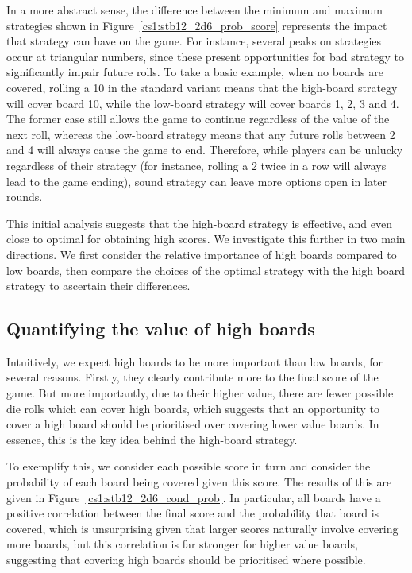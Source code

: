 In a more abstract sense, the difference between the minimum and maximum strategies shown in  Figure~\ref{cs1:stb12_2d6_prob_score} represents the impact that strategy can have on the game. For instance, several peaks on strategies occur at triangular numbers, since these present opportunities for bad strategy to significantly impair future rolls. To take a basic example, when no boards are covered, rolling a 10 in the standard variant means that the high-board strategy will cover board 10, while the low-board strategy will cover boards 1, 2, 3 and 4. The former case still allows the game to continue regardless of the value of the next roll, whereas the low-board strategy means that any future rolls between 2 and 4 will always cause the game to end. Therefore, while players can be unlucky regardless of their strategy (for instance, rolling a 2 twice in a row will always lead to the game ending), sound strategy can leave more options open in later rounds.

This initial analysis suggests that the high-board strategy is effective, and even close to optimal for obtaining high scores. We investigate this further in two main directions. We first consider the relative importance of high boards compared to low boards, then compare the choices of the optimal strategy with the high board strategy to ascertain their differences.

\subsection{Quantifying the value of high boards}

Intuitively, we expect high boards to be more important than low boards, for several reasons. Firstly, they clearly contribute more to the final score of the game. But more importantly, due to their higher value, there are fewer possible die rolls which can cover high boards, which suggests that an opportunity to cover a high board should be prioritised over covering lower value boards. In essence, this is the key idea behind the high-board strategy. 

To exemplify this, we consider each possible score in turn and consider the probability of each board being covered given this score. The results of this are given in Figure~\ref{cs1:stb12_2d6_cond_prob}.  In particular, all boards have a positive correlation between the final score and the probability that board is covered, which is unsurprising given that larger scores naturally involve covering more boards, but this correlation is far stronger for higher value boards, suggesting that covering high boards should be prioritised where possible.


